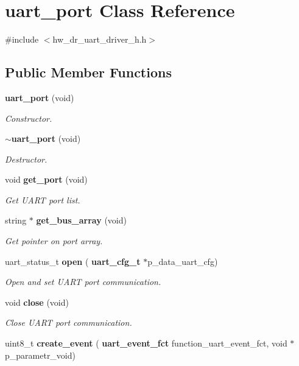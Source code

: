 \section{uart\+\_\+port Class Reference}
\label{classuart__port}


{\ttfamily \#include $<$hw\+\_\+dr\+\_\+uart\+\_\+driver\+\_\+h.\+h$>$}

\subsection*{Public Member Functions}
\begin{DoxyCompactItemize}
\item 
\textbf{ uart\+\_\+port} (void)
\begin{DoxyCompactList}\small\item\em Constructor. \end{DoxyCompactList}\item 
\textbf{ $\sim$uart\+\_\+port} (void)
\begin{DoxyCompactList}\small\item\em Destructor. \end{DoxyCompactList}\item 
void \textbf{ get\+\_\+port} (void)
\begin{DoxyCompactList}\small\item\em Get U\+A\+RT port list. \end{DoxyCompactList}\item 
string $\ast$ \textbf{ get\+\_\+bus\+\_\+array} (void)
\begin{DoxyCompactList}\small\item\em Get pointer on port array. \end{DoxyCompactList}\item 
uart\+\_\+status\+\_\+t \textbf{ open} (\textbf{ uart\+\_\+cfg\+\_\+t} $\ast$p\+\_\+data\+\_\+uart\+\_\+cfg)
\begin{DoxyCompactList}\small\item\em Open and set U\+A\+RT port communication. \end{DoxyCompactList}\item 
void \textbf{ close} (void)
\begin{DoxyCompactList}\small\item\em Close U\+A\+RT port communication. \end{DoxyCompactList}\item 
uint8\+\_\+t \textbf{ create\+\_\+event} (\textbf{ uart\+\_\+event\+\_\+fct} function\+\_\+uart\+\_\+event\+\_\+fct, void $\ast$p\+\_\+parametr\+\_\+void)

\end{DoxyCompactItemize}
